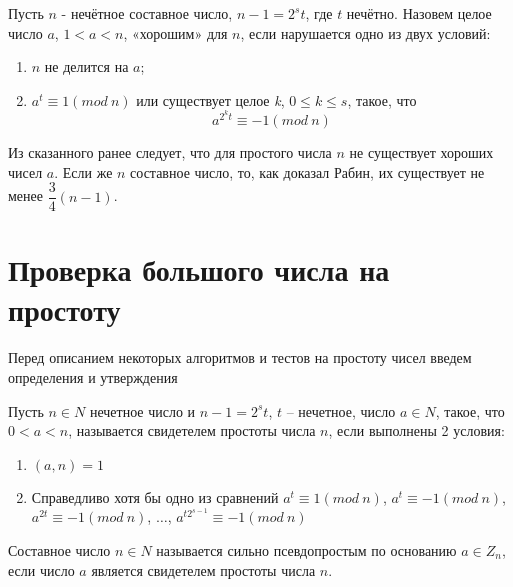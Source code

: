Пусть {$n$} - нечётное составное число, {$n - 1 = 2^{s} t$}, где {$t$} нечётно. Назовем целое число {$a$},
{$1 < a < n$}, «хорошим» для {$n$}, если нарушается одно из двух условий: 
\begin{enumerate}
 \item {$n$} не делится на {$a$};
 \item {$a^{ t} \equiv 1 (mod \: n)$} или существует целое \textit{k}, {$0 \leq k \leq s$}, такое, что
  \begin{equation}
      \textit{{$a^{ 2^{ k} t} \equiv -1 (mod \: n)$}}
  \end{equation}

\end{enumerate}
Из сказанного ранее следует, что для простого числа {$n$} не существует хороших чисел {$a$}. Если же {$n$} составное число, 
то, как доказал Рабин, их существует не менее {$\dfrac{3}{4}(n - 1)$}.


\section{Проверка большого числа на простоту}

\paragraph{} Перед описанием некоторых алгоритмов и тестов на простоту чисел введем определения и утверждения

  \begin{definition}    
  
      Пусть {$n \in N$} нечетное число и {$n - 1 = 2^{ s} t$}, {$t$} – нечетное,
    число {$a \in N$}, такое, что {$0 < a < n$}, называется свидетелем 
    простоты числа {$n$}, если выполнены 2 условия:

    \begin{enumerate}
      \item {$(a, n) = 1$}
      \item Справедливо хотя бы одно из сравнений {$a^{ t} \equiv 1 (mod \: n)$}, 
	{$a^{ t} \equiv -1 (mod \: n)$}, {$a^{ 2 t} \equiv -1(mod \: n)$},
	{$\dots$}, {$a^{ t 2^{ s-1}} \equiv -1(mod \: n)$}
    \end{enumerate}
  
  \end{definition}

  \begin{definition}    
  
      Составное число {$n \in N$} называется сильно псевдопростым по основанию {$a 
    \in Z_{ n}$}, если число {$a$} является свидетелем простоты числа {$n$}.
    
  \end{definition}

